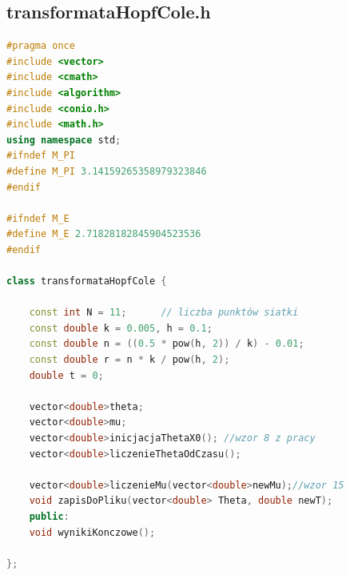\documentclass[a4paper,12pt]{article}
\begin{document}
\subsection{transformataHopfCole.h}
\begin{lstlisting}[caption={transformataHopfCole.h},label={transformataHopfCole.hCalyKod}, language=C++]
#pragma once
#include <vector>
#include <cmath>
#include <algorithm>
#include <conio.h>
#include <math.h>
using namespace std;
#ifndef M_PI
#define M_PI 3.14159265358979323846
#endif

#ifndef M_E
#define M_E 2.71828182845904523536
#endif

class transformataHopfCole {
	
	const int N = 11;      // liczba punktów siatki
	const double k = 0.005, h = 0.1;
	const double n = ((0.5 * pow(h, 2)) / k) - 0.01;
	const double r = n * k / pow(h, 2);
	double t = 0;
	
	vector<double>theta;
	vector<double>mu;
	vector<double>inicjacjaThetaX0(); //wzor 8 z pracy
	vector<double>liczenieThetaOdCzasu();
	
	vector<double>liczenieMu(vector<double>newMu);//wzor 15
	void zapisDoPliku(vector<double> Theta, double newT);
	public:
	void wynikiKonczowe();
	
};
\end{lstlisting}
\end{document}
